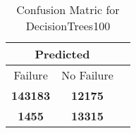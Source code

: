 \begin{table}[] 
\caption{Confusion Matric for DecisionTrees100} 
\label{Table: Prediction Accuracy-NoneDecisionTrees10085.0EKF-ignoreReflection-Reflection} 
\centering 
\begin{tabular} 
 {@{}ccc@{}} 
\toprule 
\multicolumn{2}{c}{\textbf{Predicted}}
 \\ \midrule 
\multicolumn{1}{|c|}{Failure} & 
\multicolumn{1}{c|}{No Failure}
 \\ \midrule 
\multicolumn{1}{|c|}{\color{green}\textbf{143183}} & 
\multicolumn{1}{c|}{\color{red}\textbf{12175}}
 \\ \midrule 
\multicolumn{1}{|c|}{\color{red}\textbf{1455}} & 
\multicolumn{1}{c|}{\color{green}\textbf{13315}}
 \\ \bottomrule 
\end{tabular} 
\end{table} 
